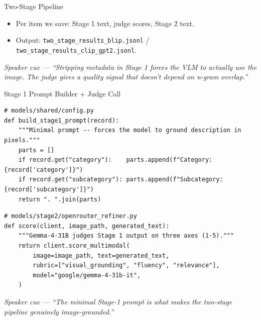 \documentclass[10pt, aspectratio=169]{beamer}
\newcommand{\speakercue}[1]{%
  \vfill
  {\footnotesize\itshape\color{gray}Speaker cue --- #1}%
}
\begin{document}
\begin{frame}{Two-Stage Pipeline}
  \begin{center}
  \end{center}
  \begin{itemize}\itemsep2pt
    \item Per item we save: Stage 1 text, judge scores, Stage 2 text.
    \item Output: \texttt{two\_stage\_results\_blip.jsonl} / \texttt{two\_stage\_results\_clip\_gpt2.jsonl}.
  \end{itemize}
  \speakercue{``Stripping metadata in Stage 1 forces the VLM to actually use
  the image. The judge gives a quality signal that doesn't depend on n-gram overlap.''}
\end{frame}

\begin{frame}[fragile]{Stage 1 Prompt Builder + Judge Call}
  \begin{lstlisting}
# models/shared/config.py
def build_stage1_prompt(record):
    """Minimal prompt -- forces the model to ground description in pixels."""
    parts = []
    if record.get("category"):    parts.append(f"Category: {record['category']}")
    if record.get("subcategory"): parts.append(f"Subcategory: {record['subcategory']}")
    return ". ".join(parts)
  \end{lstlisting}

  \begin{lstlisting}
# models/stage2/openrouter_refiner.py
def score(client, image_path, generated_text):
    """Gemma-4-31B judges Stage 1 output on three axes (1-5)."""
    return client.score_multimodal(
        image=image_path, text=generated_text,
        rubric=["visual_grounding", "fluency", "relevance"],
        model="google/gemma-4-31b-it",
    )
  \end{lstlisting}
  \speakercue{``The minimal Stage-1 prompt is what makes the two-stage
  pipeline genuinely image-grounded.''}
\end{frame}
\end{document}
